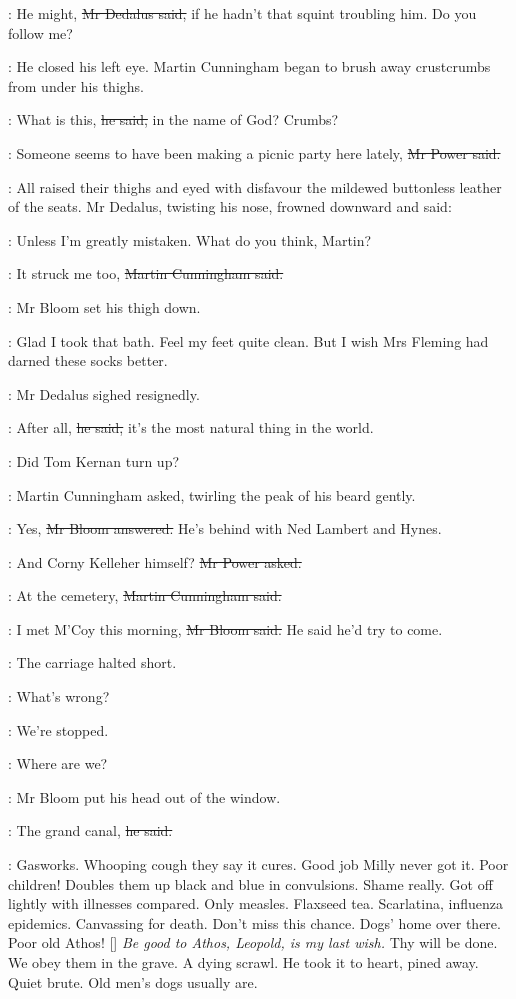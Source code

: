 \simon:
He might,
\sout{Mr Dedalus said,}
if he hadn't that squint troubling him.
Do you follow me?

:
He closed his left eye.
Martin Cunningham began to brush away crustcrumbs from under his thighs.

\cunningham:
What is this,
\sout{he said,}
in the name of God?
Crumbs?

\power:
Someone seems to have been making a picnic party here lately,
\sout{Mr Power said.}

:
All raised their thighs and eyed with disfavour
the mildewed buttonless leather of the seats.
Mr Dedalus, twisting his nose, frowned downward and said:

\simon:
Unless I'm greatly mistaken.
What do you think, Martin?

\cunningham:
It struck me too,
\sout{Martin Cunningham said.}

:
Mr Bloom set his thigh down.

\BloomInt:
Glad I took that bath.
Feel my feet quite clean.
But I wish Mrs Fleming had darned these socks better.

:
Mr Dedalus sighed resignedly.

\simon:
After all,
\sout{he said,}
it's the most natural thing in the world.

\cunningham:
Did Tom Kernan turn up?

:
Martin Cunningham asked,
twirling the peak of his beard
gently.

\Bloom:
Yes,
\sout{Mr Bloom answered.}
He's behind with Ned Lambert and Hynes.

\power:
And Corny Kelleher himself?
\sout{Mr Power asked.}

\cunningham:
At the cemetery,
\sout{Martin Cunningham said.}

\Bloom:
I met M'Coy this morning,
\sout{Mr Bloom said.}
He said he'd try to come.

:
The carriage halted short.

\simon:
What's wrong?

\power:
We're stopped.

\cunningham:
Where are we?

:
Mr Bloom put his head out of the window.

\Bloom:
The grand canal,
\sout{he said.}

\BloomInt:
Gasworks.
Whooping cough they say it cures.
Good job Milly never got it.
Poor children!
Doubles them up black and blue in convulsions.
Shame really.
Got off lightly with illnesses compared.
Only measles.
Flaxseed tea.
Scarlatina, influenza epidemics.
Canvassing for death.
Don't miss this chance.
Dogs' home over there.
Poor old Athos!
[]
\emph{Be good to Athos, Leopold, is my last wish.}
Thy will be done.
We obey them in the grave.
A dying scrawl.
He took it to heart, pined away.
Quiet brute.
Old men's dogs usually are.

